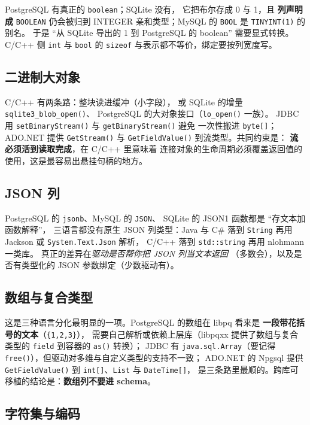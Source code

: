 \documentclass[12pt,a4paper,fontset=fandol]{ctexbook}
\newcommand{\Fn}[1]{\texttt{#1()}}
\newcommand{\Tp}[1]{\texttt{#1}}
\newcommand{\CSharp}{C\#}
\newcommand{\CppJava}{C/C++}
\begin{document}
PostgreSQL 有真正的 \texttt{boolean}；SQLite 没有，
它把布尔存成 0 与 1，且 \textbf{列声明成} \texttt{BOOLEAN}
仍会被归到 INTEGER 亲和类型；MySQL 的
\texttt{BOOL} 是 \texttt{TINYINT(1)} 的别名。
于是 ``从 SQLite 导出的 1 到 PostgreSQL 的 boolean'' 需要显式转换。
\CppJava{} 侧 \Tp{int} 与 \Tp{bool} 的 \Tp{sizeof}
与表示都不等价，绑定要按列宽度写。

\subsection{二进制大对象}

\CppJava{} 有两条路：整块读进缓冲（小字段），
或 SQLite 的增量 \Fn{sqlite3\_\allowbreak{}blob\allowbreak \_\allowbreak{}open}、
PostgreSQL 的大对象接口（\Fn{lo\_open} 一族）。
JDBC 用 \Fn{set\allowbreak{}Binary\allowbreak{}Stream} 与 \Fn{get\allowbreak{}Binary\allowbreak{}Stream} 避免
一次性搬进 \Tp{byte[]}；ADO.NET 提供 \Fn{GetStream} 与
\Fn{Get\allowbreak{}Field\allowbreak{}Value} 到流类型。共同约束是：
\textbf{流必须活到读取完成}，在 \CppJava{} 里意味着
连接对象的生命周期必须覆盖返回值的使用，这是最容易出悬挂句柄的地方。

\subsection{JSON 列}

PostgreSQL 的 \texttt{jsonb}、MySQL 的 \texttt{JSON}、
SQLite 的 JSON1 函数都是 ``存文本加函数解释''，
三语言都没有原生 JSON 列类型：Java 与 \CSharp{} 落到
\Tp{String} 再用 Jackson 或 \Tp{System.Text.\allowbreak Json} 解析，
\CppJava{} 落到 \Tp{std::string} 再用 nlohmann 一类库。
真正的差异在\emph{驱动是否帮你把 JSON 列当文本返回}
（多数会），以及是否有类型化的 JSON 参数绑定（少数驱动有）。

\subsection{数组与复合类型}

这是三种语言分化最明显的一项。PostgreSQL 的数组在 libpq
看来是 \textbf{一段带花括号的文本}（\texttt{\{1,2,3\}}），
需要自己解析或依赖上层库（libpqxx 提供了数组与复合类型的
\Tp{field} 到容器的 \Fn{as} 转换）；
JDBC 有 \Tp{java.sql.Array}（要记得
\Fn{free}），但驱动对多维与自定义类型的支持不一致；
ADO.NET 的 Npgsql 提供 \Fn{GetFieldValue} 到
\Tp{int[]}、\Tp{List} 与 \Tp{DateTime[]}，
是三条路里最顺的。跨库可移植的结论是：\textbf{数组列不要进 schema}。

\subsection{字符集与编码}
\end{document}

